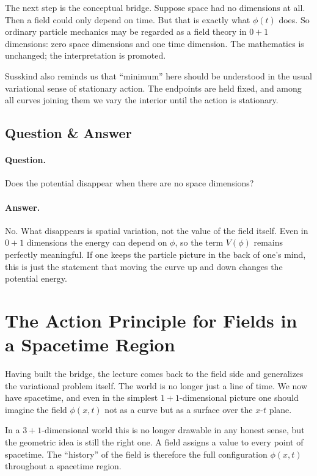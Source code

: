 The next step is the conceptual bridge. Suppose space had no dimensions at all. Then a field could only depend on time. But that is exactly what \(\phi(t)\) does. So ordinary particle mechanics may be regarded as a field theory in \(0+1\) dimensions: zero space dimensions and one time dimension. The mathematics is unchanged; the interpretation is promoted.

Susskind also reminds us that ``minimum'' here should be understood in the usual variational sense of stationary action. The endpoints are held fixed, and among all curves joining them we vary the interior until the action is stationary.

\subsection{Question \& Answer}

\paragraph{Question.} Does the potential disappear when there are no space dimensions?

\paragraph{Answer.} No. What disappears is spatial variation, not the value of the field itself. Even in \(0+1\) dimensions the energy can depend on \(\phi\), so the term \(V(\phi)\) remains perfectly meaningful. If one keeps the particle picture in the back of one's mind, this is just the statement that moving the curve up and down changes the potential energy.

\section{The Action Principle for Fields in a Spacetime Region}

Having built the bridge, the lecture comes back to the field side and generalizes the variational problem itself. The world is no longer just a line of time. We now have spacetime, and even in the simplest \(1+1\)-dimensional picture one should imagine the field \(\phi(x,t)\) not as a curve but as a surface over the \(x\)-\(t\) plane.

In a \(3+1\)-dimensional world this is no longer drawable in any honest sense, but the geometric idea is still the right one. A field assigns a value to every point of spacetime. The ``history'' of the field is therefore the full configuration \(\phi(x,t)\) throughout a spacetime region.

